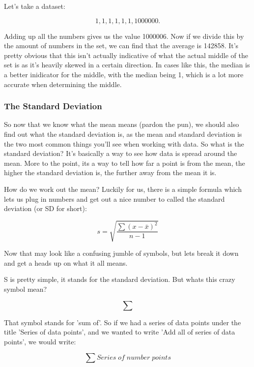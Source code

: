 \documentclass[11pt]{article}
\begin{document}
Let's take a dataset:

\begin{displaymath}
1, 1, 1, 1, 1, 1, 1000000.
\end{displaymath}

Adding up all the numbers gives us the value 1000006. Now if we divide this by the amount of numbers in the set, we can find that the average is 142858. It's pretty obvious that this isn't actually indicative of what the actual middle of the set is as it's heavily skewed in a certain direction. In cases like this, the median is a better inidicator for the middle, with the median being 1, which is a lot more accurate when determining the middle.

\subsubsection*{The Standard Deviation}

So now that we know what the mean means (pardon the pun), we should also find out what the standard deviation is, as the mean and standard deviation is the two most common things you'll see when working with data. So what is the standard deviation? It's basically a way to see how data is spread around the mean. More to the point, its a way to tell how far a point is from the mean, the higher the standard deviation is, the further away from the mean it is. 

How do we work out the mean? Luckily for us, there is a simple formula which lets us plug in numbers and get out a nice number to called the standard deviation (or SD for short):

\begin{displaymath}
s = \sqrt{\frac{\sum (x - \bar{x})^{2}}{n-1}}
\end{displaymath}

Now that may look like a confusing jumble of symbols, but lets break it down and get a heads up on what it all means. 

S is pretty simple, it stands for the standard deviation. But whats this crazy symbol mean?

\begin{displaymath}
\sum
\end{displaymath}

That symbol stands for 'sum of'. So if we had a series of data points under the title 'Series of data points', and we wanted to write 'Add all of series of data points', we would write:

\begin{displaymath}
\sum Series \; of \; number \; points
\end{displaymath}
\end{document}

